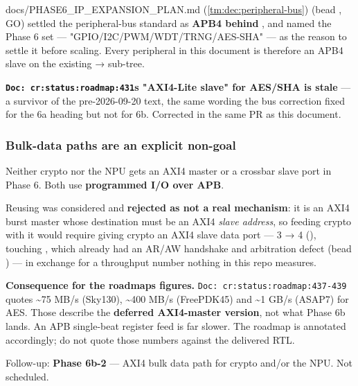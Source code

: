 \begin{relocated}{docs/PHASE6_IP_EXPANSION_PLAN.md}
 (\cref{tm:dec:peripheral-bus}) (bead , GO) settled
the peripheral-bus standard as \textbf{APB4 behind
}, and named the Phase 6 set ---
"GPIO/\allowbreak{}I2C/\allowbreak{}PWM/\allowbreak{}WDT/\allowbreak{}TRNG/\allowbreak{}AES-SHA"
--- as the reason to settle it before scaling. Every peripheral in this
document is therefore an APB4 slave on the existing  →
 sub-tree.

\textbf{\texttt{Doc:\allowbreak{}\ cr:\allowbreak{}status:\allowbreak{}roadmap:\allowbreak{}431}\textquotesingle s
"AXI4-Lite slave" for AES/SHA is stale} --- a survivor of the
pre-2026-09-20 text, the same wording the bus correction fixed for the
6a heading but not for 6b. Corrected in the same PR as this document.

\subsubsection{Bulk-data paths are an explicit non-goal}\label{ds:ch:phase6-ip-expansion-plan:bulk-data-paths-are-an-explicit-non-goal}

Neither crypto nor the NPU gets an AXI4 master or a crossbar slave port
in Phase 6. Both use \textbf{programmed I/O over APB}.

Reusing  was considered and
\textbf{rejected as not a real mechanism}: it is an AXI4 burst master
whose destination must be an AXI4 \emph{slave address}, so feeding
crypto with it would require giving crypto an AXI4 slave data port ---
 3 → 4 (),
touching , which already had an AR/AW handshake and
arbitration defect (bead ) --- in exchange for a throughput
number nothing in this repo measures.

\warn{} \textbf{Consequence for the roadmap\textquotesingle s figures.}
\texttt{Doc:\allowbreak{}\ cr:\allowbreak{}status:\allowbreak{}roadmap:\allowbreak{}437-\allowbreak{}439}
quotes \textasciitilde75 MB/s (Sky130), \textasciitilde400 MB/s
(FreePDK45) and \textasciitilde1 GB/s (ASAP7) for AES. Those describe
the \textbf{deferred AXI4-master version}, not what Phase 6b lands. An
APB single-beat register feed is far slower. The roadmap is annotated
accordingly; do not quote those numbers against the delivered RTL.

Follow-up: \textbf{Phase 6b-2} --- AXI4 bulk data path for crypto and/or
the NPU. Not scheduled.


\end{relocated}
